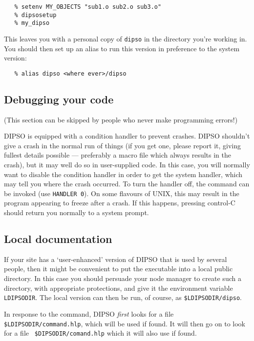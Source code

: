 \begin{verbatim}
   % setenv MY_OBJECTS "sub1.o sub2.o sub3.o"
   % dipsosetup
   % my_dipso
\end{verbatim}

This leaves you with a personal copy of {\tt{dipso}}  in the directory you're
working in. You should then set up an alias to run this version in preference
to the system version:

\begin{verbatim}
   % alias dipso <where ever>/dipso
\end{verbatim}

\subsection {Debugging your code}

(This section can be skipped by people who never make programming
errors!)

DIPSO is equipped with a condition handler to prevent crashes. DIPSO
shouldn't give a crash in the normal run of things (if you get one,
please report it, giving fullest details possible --- preferably a macro
file which always results in the crash), but it may well do so in
user-supplied code. In this case, you will normally want to disable the
condition handler in order to get the system handler, which may tell you
where the crash occurred. To turn the handler off, the  
command can be invoked (use {\tt{HANDLER}  0}). On some flavours of UNIX,
this may result in the program appearing to freeze after a crash. If this
happens, pressing control-C should return you normally to a system
prompt.

\subsection {\label{SEC:LOC}Local documentation}

If your site has a `user-enhanced' version of DIPSO that is used by
several people, then it might be convenient to put the executable into a
local public directory. In this case you should persuade your node
manager to create such a directory, with appropriate protections, and
give it the environment variable {\tt{LDIPSODIR}}.  The local version can
then be run, of course, as {\tt{\$LDIPSODIR/dipso}}. 

In response to the   command, DIPSO {\em
first} looks for a file {\tt{\$LDIPSO\-DIR/command\-.hlp}},  which will be
used if found. It will then go on to look for a file {\tt
\$DIPSODIR/comand\-.hlp} which it will also use if found.


